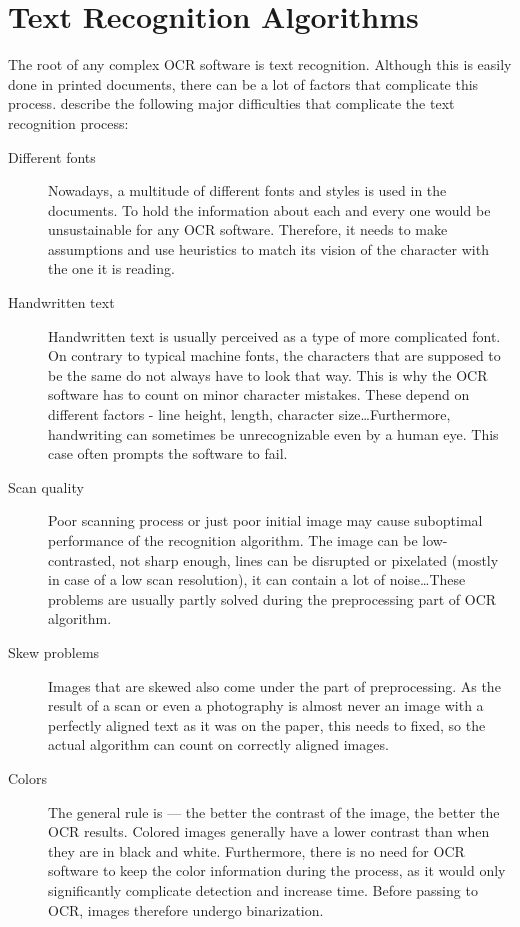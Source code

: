 \chapter{Text Recognition Algorithms}

The root of any complex OCR software is text recognition.
Although this is easily done in printed documents, there can be a lot of factors that complicate this process.
\citet{preprocessAll} describe the following major difficulties that complicate the text recognition process:

\begin{description}
\item[Different fonts] Nowadays, a multitude of different fonts and styles is used in the documents. To hold the information about each and every one would be unsustainable for any OCR software. Therefore, it needs to make assumptions and use heuristics to match its vision of the character with the one it is reading.
\item[Handwritten text] Handwritten text is usually perceived as a type of more complicated font. On contrary to typical machine fonts, the characters that are supposed to be the same do not always have to look that way. This is why the OCR software has to count on minor character mistakes. These depend on different factors - line height, length, character size\ldots Furthermore, handwriting can sometimes be unrecognizable even by a human eye. This case often prompts the software to fail.
\item[Scan quality] Poor scanning process or just poor initial image may cause suboptimal performance of the recognition algorithm. The image can be low-contrasted, not sharp enough, lines can be disrupted or pixelated (mostly in case of a low scan resolution), it can contain a lot of noise\ldots These problems are usually partly solved during the preprocessing part of OCR algorithm.
\item[Skew problems] Images that are skewed also come under the part of preprocessing. As the result of a scan or even a photography is almost never an image with a perfectly aligned text as it was on the paper, this needs to fixed, so the actual algorithm can count on correctly aligned images.
\item[Colors] The general rule is --- the better the contrast of the image, the better the OCR results. Colored images generally have a lower contrast than when they are in black and white. Furthermore, there is no need for OCR software to keep the color information during the process, as it would only significantly complicate detection and increase time. Before passing to OCR, images therefore undergo binarization.

\end{description}
